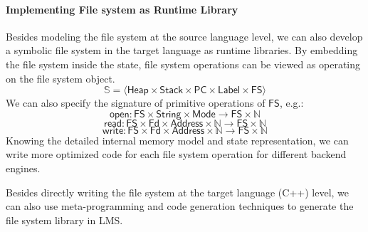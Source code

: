 \documentclass[sigplan, nonacm]{acmart}\settopmatter{printfolios=true,printccs=false,printacmref=false}
\newcommand{\msf}[1]{\ensuremath{\mathsf{#1}}}
\newcommand{\State}{\mathbb{S}}
\begin{document}
 \paragraph*{Implementing File system as Runtime Library}
 Besides modeling the file system at the source language level, we can also develop a symbolic file system in the target language as runtime libraries. By embedding the file system inside the state, file system operations can be viewed as operating on the file system object.
$$ \State = \langle \msf{Heap} \times \msf{Stack} \times \msf{PC} \times \msf{Label} \times \msf{FS} \rangle $$
We can also specify the signature of primitive operations of \msf{FS}, e.g.:
$$ \msf{open} : \msf{FS} \times \msf{String} \times \msf{Mode} \to \msf{FS} \times \mathbb{N}$$
$$ \msf{read} : \msf{FS} \times \msf{Fd} \times \msf{Address} \times \mathbb{N} \to \msf{FS} \times \mathbb{N}$$
$$ \msf{write} : \msf{FS} \times \msf{Fd} \times \msf{Address} \times \mathbb{N} \to \msf{FS} \times \mathbb{N}$$
Knowing the detailed internal memory model and state representation, we can write more optimized code for each file system operation for different backend engines.\par
Besides directly writing the file system at the target language (C++) level, we can also use meta-programming and code generation techniques to generate the file system library in LMS.
\end{document}
